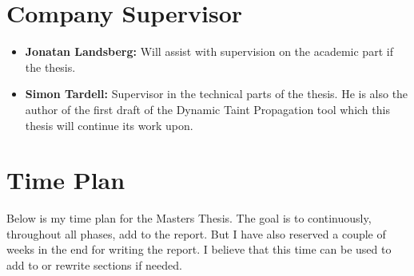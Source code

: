 \documentclass{../kththesis}
\begin{document}
\section{Company Supervisor}
\begin{itemize}
	\item \textbf{Jonatan Landsberg:} Will assist with supervision on the academic part if the thesis.
	\item \textbf{Simon Tardell:} Supervisor in the technical parts of the thesis. He is also the author of the first draft of the Dynamic Taint Propagation tool which this thesis will continue its work upon. 
\end{itemize}


\section{Time Plan}
Below is my time plan for the Masters Thesis. The goal is to continuously, throughout all phases, add to the report. But I have also reserved a couple of weeks in the end for writing the report. I believe that this time can be used to add to or rewrite sections if needed. \\ \\

\begin{ganttchart}{1}{20}
	 \\
	\\
	 \\
	 \\
	 \\
	 \\
	 \\
	 \\
\end{ganttchart}

\printbibliography[heading=bibintoc] %
\end{document}
